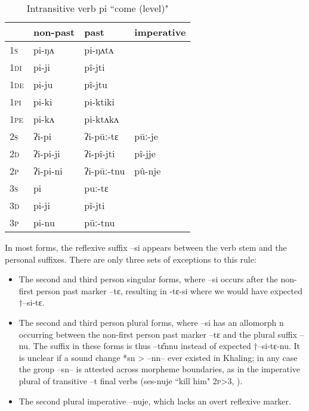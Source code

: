\documentclass[twoside,a4paper,11pt]{article}
\newcommand{\ipa}[1]{{\phon#1}}
\begin{document}
\begin{table}[h] 
\caption{Intransitive verb \ipa{pi} ``come (level)" } \centering \label{tab:pi}
\begin{tabular}{l|l|l|l}  
 \toprule
& non-past & past & imperative\\
\midrule
\textsc{1s}  &  \ipa{pi-ŋʌ}  &  \ipa{pi-ŋʌtʌ}   \\
\textsc{1di}  &  \ipa{pi-ji}  &  \ipa{pî-jti}   \\
\textsc{1de}  &  \ipa{pi-ju}  &  \ipa{pî-jtu}   \\
\textsc{1pi}  &  \ipa{pi-ki}  &  \ipa{pi-ktiki}   \\
\textsc{1pe}  &  \ipa{pi-kʌ}  &  \ipa{pi-ktʌkʌ}   \\
\midrule
\textsc{2s}  &  \ipa{ʔi-pi}  &  \ipa{ʔi-pūː-tɛ}  &  \ipa{pūː-je}   \\
\textsc{2d}  &  \ipa{ʔi-pi-ji}  &  \ipa{ʔi-pî-jti}  &  \ipa{pî-jje}   \\
\textsc{2p}  &  \ipa{ʔi-pi-ni}  &  \ipa{ʔi-pūː-tnu}  &  \ipa{pû-nje}   \\
\midrule
\textsc{3s}  &  \ipa{pi}  &  \ipa{puː-tɛ}   \\
\textsc{3d}  &  \ipa{pi-ji}  &  \ipa{pî-jti}   \\
\textsc{3p}  &  \ipa{pi-nu}  &  \ipa{pūː-tnu}   \\
\bottomrule
\end{tabular}
\end{table}


In most forms, the reflexive suffix \ipa{--si} appears between the verb stem and the personal suffixes. There are only three sets of exceptions to this rule:

\begin{itemize}
\item The second and third person singular forms, where \ipa{--si} occurs after the  non-first person past marker \ipa{--tɛ}, resulting in \ipa{-tɛ-si} where we would have expected †\ipa{--si-tɛ}.
\item The   second and third person plural forms, where \ipa{--si} has an allomorph  \ipa{n} occurring between the  non-first person past marker \ipa{--tɛ}  and the plural suffix --\ipa{nu}.  The suffix in these forms is thus \ipa{--tɛ̂nnu} instead of expected †\ipa{--si-tɛ-nu}. It is unclear if a sound change *\ipa{sn} > --\ipa{nn}-- ever existed in Khaling; in any case the group \ipa{--sn--} is attested across morpheme boundaries, as in the imperative plural of transitive \ipa{--t} final verbs (\ipa{ses-nuje} ``kill him" \textsc{2p>3},  \citealt[1118]{jacques12khaling}). 
\item The second plural imperative \ipa{--nuje}, which lacks an  overt reflexive marker.
\end{itemize}
\end{document}
